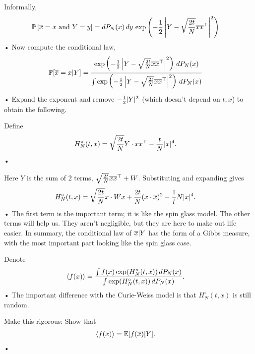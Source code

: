 Informally, 
\begin{align*}
\mathbb{P}\left[ {\overline{x}=x \text{ and }Y=y} \right]
&= dP_N(x)\,dy\, \exp\left( {-\frac{1}{2} \left| {Y-\sqrt{\frac{2t}{N}}\overline{x}\overline{x}^\top } \right|^2} \right)
\end{align*}•
Now compute the conditional law,
\begin{align*}
\mathbb{P}[\overline{x}= x|Y] &= \frac{\exp\left( {-\frac{1}{2} \left| {Y-\sqrt{\frac{2t}{N}}\overline{x}\overline{x}^\top } \right|^2} \right)\,dP_N(x)}{\int \exp\left( {-\frac{1}{2} \left| {Y-\sqrt{\frac{2t}{N}}\overline{x}\overline{x}^\top } \right|^2} \right)\,dP_N(x)}
\end{align*}•
Expand the exponent and remove $-\frac{1}{2}|Y|^2$ (which doesn't depend on $t,x$) to obtain the following.
\begin{df}
Define
\begin{align*}
H_N^\circ (t,x) &= \sqrt{\frac{2t}{N}} Y \cdot xx^\top - \frac{t}{N} |x|^4.
\end{align*}•
\end{df}
Here $Y$ is the sum of 2 terms, $\sqrt{\frac{2t}{N}} \overline{x} \overline{x}^\top +W$. Substituting and expanding gives
\begin{align*}
H_N^\circ (t,x) &= \sqrt{\frac{2t}{N}} x\cdot Wx + \frac{2t}{N}(x\cdot \overline{x})^2 - \frac{1}{t}N |x|^4.
\end{align*}•
The first term is the important term; it is like the spin glass model. 
The other terms will help us. They aren't negligible, but they are here to make out life easier. 
In summary, the conditional law of $\overline{x}|Y$ has the form of a Gibbs measure, with the most important part looking like the spin glass case.

Denote 
\begin{align*}
\left\langle {f(x)}\right\rangle &= \frac{\int f(x) \exp(H_N^\circ (t,x))\,dP_N(x)}{\int \exp(H_N^\circ (t,x))\,dP_N(x)}.
\end{align*}•
The important difference with the Curie-Weiss model is that $H_N^\circ (t,x)$ is still random. 

\begin{exr}
Make this rigorous: Show that
\begin{align*}
\left\langle {f(x)}\right\rangle &= \mathbb{E}[f(\overline{x})|Y].
\end{align*}•
\end{exr}

